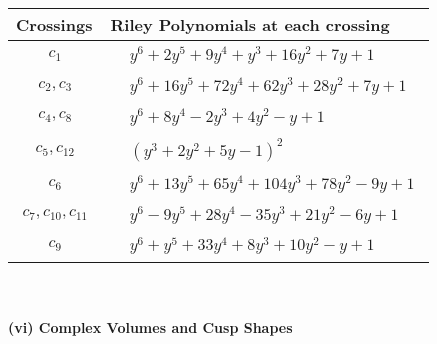 \documentclass[1p]{elsarticle_modified}
\theoremstyle{definition}
\begin{document}
\begin{tabular}{m{50pt}|m{274pt}}
Crossings & \hspace{64pt}Riley Polynomials at each crossing \\
\hline $$\begin{aligned}c_{1}\end{aligned}$$&$\begin{aligned}
&y^6+2 y^5+9 y^4+y^3+16 y^2+7 y+1
\end{aligned}$\\
\hline $$\begin{aligned}c_{2},c_{3}\end{aligned}$$&$\begin{aligned}
&y^6+16 y^5+72 y^4+62 y^3+28 y^2+7 y+1
\end{aligned}$\\
\hline $$\begin{aligned}c_{4},c_{8}\end{aligned}$$&$\begin{aligned}
&y^6+8 y^4-2 y^3+4 y^2- y+1
\end{aligned}$\\
\hline $$\begin{aligned}c_{5},c_{12}\end{aligned}$$&$\begin{aligned}
&(y^3+2 y^2+5 y-1)^2
\end{aligned}$\\
\hline $$\begin{aligned}c_{6}\end{aligned}$$&$\begin{aligned}
&y^6+13 y^5+65 y^4+104 y^3+78 y^2-9 y+1
\end{aligned}$\\
\hline $$\begin{aligned}c_{7},c_{10},c_{11}\end{aligned}$$&$\begin{aligned}
&y^6-9 y^5+28 y^4-35 y^3+21 y^2-6 y+1
\end{aligned}$\\
\hline $$\begin{aligned}c_{9}\end{aligned}$$&$\begin{aligned}
&y^6+y^5+33 y^4+8 y^3+10 y^2- y+1
\end{aligned}$\\
\hline
\end{tabular}\\~\\
\newpage\flushleft \textbf{(vi) Complex Volumes and Cusp Shapes}
\end{document}
